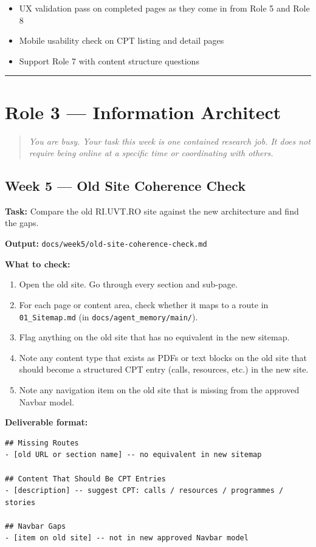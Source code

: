 \documentclass[11pt,a4paper]{article}
\newcommand{\grouprule}{\vspace{0.3em}\textcolor{ruleLine}{\rule{\linewidth}{0.4pt}}\vspace{0.3em}}
\begin{document}
\begin{itemize}
\item UX validation pass on completed pages as they come in from Role 5 and Role 8
\item Mobile usability check on CPT listing and detail pages
\item Support Role 7 with content structure questions
\end{itemize}

\grouprule

\section{Role 3 — Information Architect}

\begin{quote}\itshape
You are busy. Your task this week is one contained research job. It does not require being online at a specific time or coordinating with others.
\end{quote}

\subsection{Week 5 — Old Site Coherence Check}

\textbf{Task:} Compare the old RI.UVT.RO site against the new architecture and find the gaps.

\textbf{Output:} \nolinkurl{docs/week5/old-site-coherence-check.md}

\textbf{What to check:}

\begin{enumerate}
\item Open the old site. Go through every section and sub-page.
\item For each page or content area, check whether it maps to a route in \nolinkurl{01_Sitemap.md} (in \nolinkurl{docs/agent_memory/main/}).
\item Flag anything on the old site that has no equivalent in the new sitemap.
\item Note any content type that exists as PDFs or text blocks on the old site that should become a structured CPT entry (calls, resources, etc.) in the new site.
\item Note any navigation item on the old site that is missing from the approved Navbar model.
\end{enumerate}

\textbf{Deliverable format:}

\begin{lstlisting}
## Missing Routes
- [old URL or section name] -- no equivalent in new sitemap

## Content That Should Be CPT Entries
- [description] -- suggest CPT: calls / resources / programmes / stories

## Navbar Gaps
- [item on old site] -- not in new approved Navbar model
\end{lstlisting}
\end{document}
